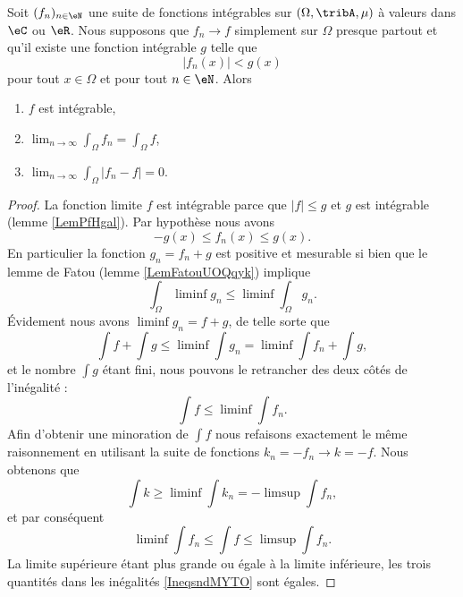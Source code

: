 \begin{theorem}        \label{ThoConvDomLebVdhsTf}
    Soit \( (f_n)_{n\in\eN}\) une suite de fonctions intégrables sur \( (\Omega,\tribA,\mu)\) à valeurs dans \( \eC\) ou \( \eR\). Nous supposons que  \( f_n\to f\) simplement sur \( \Omega\) presque partout et qu'il existe une fonction intégrable \( g\) telle que
    \begin{equation}
        | f_n(x) |< g(x) 
    \end{equation}
    pour tout \( x\in\Omega\) et pour tout \( n\in \eN\). Alors
    \begin{enumerate}
        \item
            \( f\) est intégrable,
        \item
           $\lim_{n\to \infty} \int_{\Omega}f_n=\int_\Omega f$,
        \item
            $\lim_{n\to \infty} \int_{\Omega}| f_n-f |=0$.
    \end{enumerate}
\end{theorem}

\begin{proof}

    La fonction limite \( f\) est intégrable parce que \( | f |\leq g\) et \( g\) est intégrable (lemme \ref{LemPfHgal}). Par hypothèse nous avons
    \begin{equation}
        -g(x)\leq f_n(x)\leq g(x).
    \end{equation}
    En particulier la fonction \( g_n=f_n+g\) est positive et mesurable si bien que le lemme de Fatou (lemme \ref{LemFatouUOQqyk}) implique
    \begin{equation}
        \int_{\Omega}\liminf g_n\leq\liminf\int_{\Omega}g_n.
    \end{equation}
    Évidement nous avons \( \liminf g_n=f+g\), de telle sorte que
    \begin{equation}
        \int f+\int g\leq \liminf\int g_n=\liminf\int f_n+\int g,
    \end{equation}
    et le nombre \( \int g\) étant fini, nous pouvons le retrancher des deux côtés de l'inégalité :
    \begin{equation}
        \int f\leq\liminf\int f_n.
    \end{equation}
    Afin d'obtenir une minoration de \( \int f\) nous refaisons exactement le même raisonnement en utilisant la suite de fonctions \( k_n=-f_n\to k=-f\). Nous obtenons que
    \begin{equation}
        \int k\geq\liminf\int k_n=-\limsup\int f_n,
    \end{equation}
    et par conséquent
    \begin{equation}    \label{IneqsndMYTO}
        \liminf\int f_n\leq\int f\leq\limsup\int f_n.
    \end{equation}
    La limite supérieure étant plus grande ou égale à la limite inférieure, les trois quantités dans les inégalités \eqref{IneqsndMYTO} sont égales.
\end{proof}

